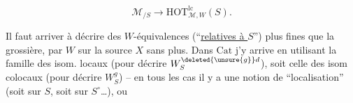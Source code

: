 \[
\mathcal M_{/S}\longrightarrow\mathrm{HOT}_{\mathcal M,W}^{\mathrm{lc}}(S).
\]

Il faut arriver à décrire des  $W$-équivalences (``\uline{relatives à $S$}'') plus fines que la grossière,   par $W$ sur la source $X$ sans plus. Dans $\mathrm{Cat}$ j'y arrive en utilisant  la famille des isom. locaux (pour décrire $W_S^{\deleted{\unsure{g}}d}$), soit celle des isom colocaux (pour décrire $W_S^g$) -- en tous les cas il y a une notion de ``localisation'' (soit sur $S$, soit sur $S^\circ$\ldots), ou
